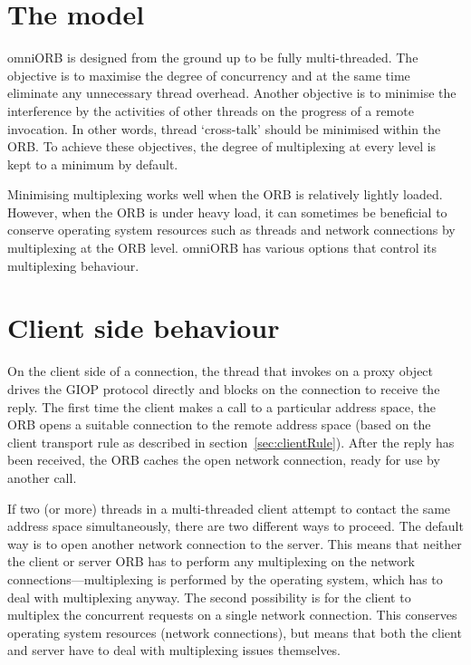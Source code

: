 \documentclass[11pt,twoside,a4paper]{book}
\begin{document}
\section{The model}

omniORB is designed from the ground up to be fully multi-threaded. The
objective is to maximise the degree of concurrency and at the same
time eliminate any unnecessary thread overhead. Another objective is
to minimise the interference by the activities of other threads on the
progress of a remote invocation. In other words, thread `cross-talk'
should be minimised within the ORB. To achieve these objectives, the
degree of multiplexing at every level is kept to a minimum by default.

Minimising multiplexing works well when the ORB is relatively lightly
loaded. However, when the ORB is under heavy load, it can sometimes be
beneficial to conserve operating system resources such as threads and
network connections by multiplexing at the ORB level. omniORB has
various options that control its multiplexing behaviour.


\section{Client side behaviour}

On the client side of a connection, the thread that invokes on a proxy
object drives the GIOP protocol directly and blocks on the connection
to receive the reply. The first time the client makes a call to a
particular address space, the ORB opens a suitable connection to the
remote address space (based on the client transport rule as described
in section~\ref{sec:clientRule}). After the reply has been received,
the ORB caches the open network connection, ready for use by another
call.

If two (or more) threads in a multi-threaded client attempt to contact
the same address space simultaneously, there are two different ways to
proceed. The default way is to open another network connection to the
server. This means that neither the client or server ORB has to
perform any multiplexing on the network connections---multiplexing is
performed by the operating system, which has to deal with multiplexing
anyway. The second possibility is for the client to multiplex the
concurrent requests on a single network connection. This conserves
operating system resources (network connections), but means that both
the client and server have to deal with multiplexing issues
themselves.
\end{document}
